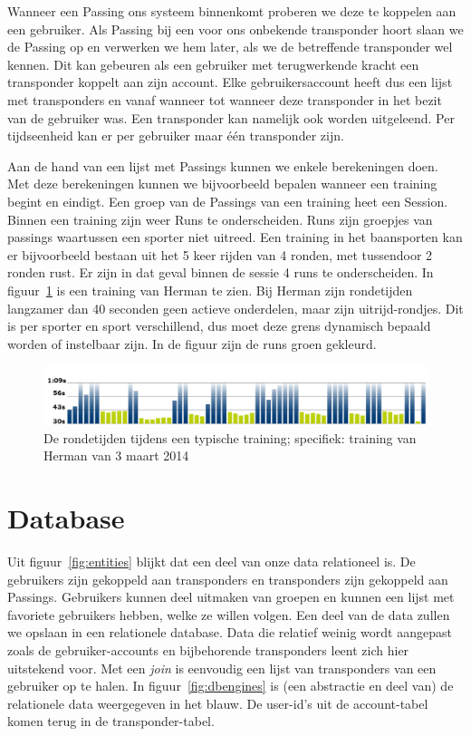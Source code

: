 Wanneer een Passing ons systeem binnenkomt proberen we deze te koppelen aan een gebruiker. Als Passing bij een voor ons onbekende transponder hoort slaan we de Passing op en verwerken we hem later, als we de betreffende transponder wel kennen. Dit kan gebeuren als een gebruiker met terugwerkende kracht een transponder koppelt aan zijn account. Elke gebruikersaccount heeft dus een lijst met transponders en vanaf wanneer tot wanneer deze transponder in het bezit van de gebruiker was. Een transponder kan namelijk ook worden uitgeleend. Per tijdseenheid kan er per gebruiker maar één transponder zijn.

Aan de hand van een lijst met Passings kunnen we enkele berekeningen doen. Met deze berekeningen kunnen we bijvoorbeeld bepalen wanneer een training begint en eindigt. Een groep van de Passings van een training heet een Session. Binnen een training zijn weer Runs te onderscheiden. Runs zijn groepjes van passings waartussen een sporter niet uitreed. Een training in het baansporten kan er bijvoorbeeld bestaan uit het 5 keer rijden van 4 ronden, met tussendoor 2 ronden rust. Er zijn in dat geval binnen de sessie 4 runs te onderscheiden. In figuur~\ref{fig:sessions} is een training van Herman te zien. Bij Herman zijn rondetijden langzamer dan 40 seconden  geen actieve onderdelen, maar zijn uitrijd-rondjes. Dit is per sporter en sport verschillend, dus moet deze grens dynamisch bepaald worden of instelbaar zijn. In de figuur zijn de runs groen gekleurd.

\begin{figure}
\centering
\includegraphics[width=1\textwidth]{style/images/MyLapsHerman}
\caption{De rondetijden tijdens een typische training; specifiek: training van Herman van 3 maart 2014}
\label{fig:sessions}
\end{figure}

\section{Database}
Uit figuur~\ref{fig:entities} blijkt dat een deel van onze data relationeel is. De gebruikers zijn gekoppeld aan transponders en transponders zijn gekoppeld aan Passings. Gebruikers kunnen deel uitmaken van groepen en kunnen een lijst met favoriete gebruikers hebben, welke ze willen volgen. Een deel van de data zullen we opslaan in een relationele database. Data die relatief weinig wordt aangepast zoals de gebruiker-accounts en bijbehorende transponders leent zich hier uitstekend voor. Met een \textit{join} is eenvoudig een lijst van transponders van een gebruiker op te halen. In figuur~\ref{fig:dbengines} is (een abstractie en deel van) de relationele data weergegeven in het blauw. De user-id's uit de account-tabel komen terug in de transponder-tabel.

